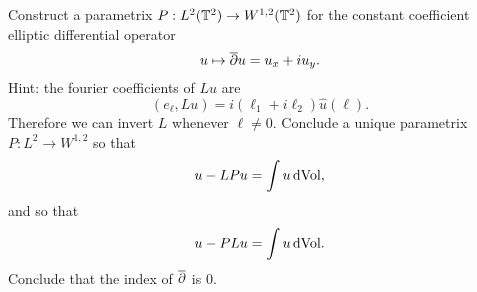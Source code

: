 \documentclass{amsart}
\begin{document}
\begin{xca}
  Construct a parametrix $P:L^{2}(\mathbb{T}^{2})\to W^{1,2}(\mathbb{T}^{2})$ for the constant coefficient elliptic differential operator
  \begin{equation*}
    u\mapsto \overline{\partial} u=u_{x}+iu_{y}.
  \end{equation*}
  Hint: the fourier coefficients of $Lu$ are
  \begin{equation*}
    (e_{\ell},Lu)=i(\ell_{1}+i\ell_{2})\hat{u}(\ell).
  \end{equation*}
  Therefore we can invert $L$ whenever $\ell\ne 0$. Conclude a unique parametrix $P:L^{2}\to W^{1,2}$ so that
  \begin{equation*}
    u-LPu=\int u\,\mathrm{d}\mathrm{Vol},
  \end{equation*}
  and so that
  \begin{equation*}
    u-PLu=\int u\,\mathrm{d}\mathrm{Vol}.
  \end{equation*}
  Conclude that the index of $\overline{\partial}$ is $0$.
\end{xca}
\end{document}
